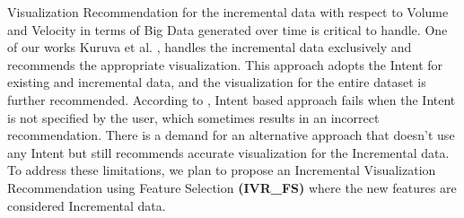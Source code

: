 Visualization Recommendation for the incremental data with respect to Volume and Velocity in terms of Big Data generated over time is critical to handle. One of our works Kuruva et al. \cite{kuruva2023visualization}, handles the incremental data exclusively and recommends the appropriate visualization. This approach adopts the Intent \cite{maruta2021intent} for existing and incremental data, and the visualization for the entire dataset is further recommended. According to \cite{kuruva2023visualization}, Intent based approach \cite{maruta2021intent} fails when the Intent is not specified by the user, which sometimes results in an incorrect recommendation. There is a demand for an alternative approach that doesn't use any Intent but still recommends accurate visualization for the Incremental data. To address these limitations, we plan to propose an Incremental Visualization Recommendation using Feature Selection \textbf{(IVR\_FS)} where the new features are considered Incremental data. 


